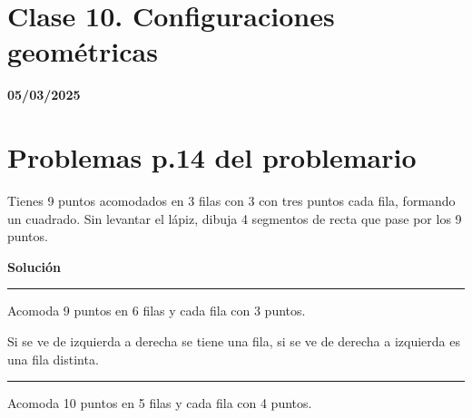 \section{Clase 10. Configuraciones geométricas}
\textbf{05/03/2025}

\section{Problemas p.14 del problemario}


\begin{minipage}[t]{0.48\textwidth}
    \noindent
    \begin{excercise}
        Tienes 9 puntos acomodados en 3 filas con 3 con tres puntos cada fila, formando un cuadrado. Sin levantar el lápiz, dibuja 4 segmentos de recta que pase por los 9 puntos.
    \end{excercise}
\end{minipage}
\begin{minipage}[t]{0.48\textwidth}
    \begin{center}
        \textbf{Solución}
    \end{center}
    \begin{center}
        
    \end{center}
\end{minipage}
\par

\bigskip
\noindent\hrule
\bigskip

\par
\begin{minipage}[t]{0.48\textwidth}
    \bigskip \bigskip
    \begin{excercise}
        Acomoda 9 puntos en 6 filas y cada fila con 3 puntos.
    \end{excercise}
\end{minipage}
\begin{minipage}[t]{0.48\textwidth}
    \noindent
    \begin{center}
        
    \end{center}
    Si se ve de izquierda a derecha se tiene una fila, si se ve de derecha a izquierda es una fila distinta.
\end{minipage}
\par

\bigskip
\noindent\hrule
\bigskip

\par
\begin{minipage}[t]{0.48\textwidth}
    \begin{excercise}
        Acomoda 10 puntos en 5 filas y cada fila con 4 puntos.
    \end{excercise}
\end{minipage}
\begin{minipage}[t]{0.48\textwidth}
    \noindent
    \begin{center}
        
    \end{center}
\end{minipage}
